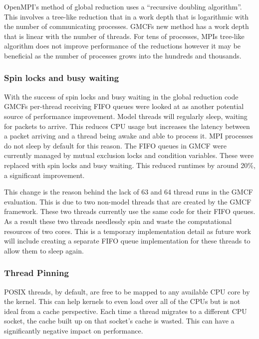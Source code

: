 OpenMPI's method of global reduction uses a ``recursive doubling algorithm''.
This involves a tree-like reduction that in a work depth that is logarithmic
with the number of communicating processes. GMCFs new method has a work depth
that is linear with the number of threads. For tens of processes, MPIs tree-like
algorithm does not improve performance of the reductions however it may be
beneficial as the number of processes grows into the hundreds and thousands.

\subsubsection{Spin locks and busy waiting}

With the success of spin locks and busy waiting in the global reduction code
GMCFs per-thread receiving FIFO queues were looked at as another potential
source of performance improvement. Model threads will regularly sleep, waiting
for packets to arrive. This reduces CPU usage but increases the latency between
a packet arriving and a thread being awake and able to process it. MPI processes
do not sleep by default for this reason. The FIFO queues in GMCF were currently
managed by mutual exclusion locks and condition variables. These were replaced
with spin locks and busy waiting. This reduced runtimes by around 20\%, a
significant improvement.

This change is the reason behind the lack of 63 and 64 thread runs in the GMCF
evaluation. This is due to two non-model threads that are created by the GMCF
framework. These two threads currently use the same code for their FIFO queues.
As a result these two threads needlessly spin and waste the computational
resources of two cores. This is a temporary implementation detail as future work
will include creating a separate FIFO queue implementation for these threads to
allow them to sleep again.

\subsubsection{Thread Pinning}

POSIX threads, by default, are free to be mapped to any available CPU core by
the kernel. This can help kernels to even load over all of the CPUs but is not
ideal from a cache perspective. Each time a thread migrates to a different CPU
socket, the cache built up on that socket's cache is wasted. This can have a
significantly negative impact on performance.

